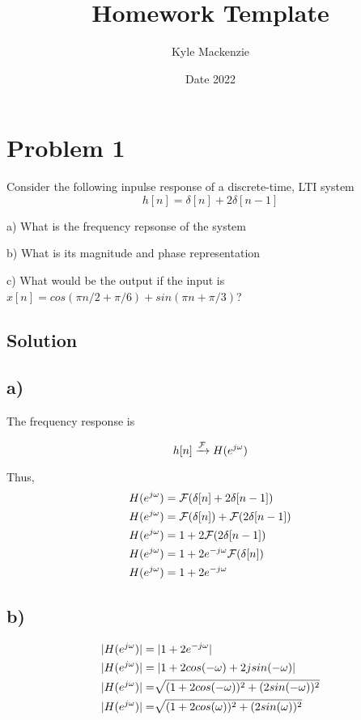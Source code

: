 \documentclass[11pt, fleqn]{article}
\title{Homework Template}
\author{Kyle Mackenzie}
\date{Date 2022}
\begin{document}
\allowdisplaybreaks

\maketitle

\pagebreak

\section*{Problem 1}

Consider the following inpulse response of a discrete-time, LTI system
$$
    h[n] = \delta[n] + 2\delta[n-1]
$$

a) What is the frequency repsonse of the system

b) What is its magnitude and phase representation

c) What would be the output if the input is $x[n] = cos(\pi n/2 + \pi/6) + sin(\pi n + \pi / 3)$?

\subsection*{Solution}

\subsection*{a)}

The frequency response is 

$$
    h[n] \xrightarrow{\mathcal{F}} H(e^{j\omega})
$$

Thus, 
\begin{align*}
    &H(e^{j\omega}) = \mathcal{F}(\delta[n] + 2\delta[n-1]) \\ 
    &H(e^{j\omega}) = \mathcal{F}(\delta[n]) + \mathcal{F}(2\delta[n-1]) \\
    &H(e^{j\omega}) = 1 + 2\mathcal{F}(2\delta[n-1]) \\
    &H(e^{j\omega}) = 1 + 2e^{-j\omega}\mathcal{F}(\delta[n]) \\
    &H(e^{j\omega}) = 1 + 2e^{-j\omega} \\
\end{align*}

\subsection*{b)}

\begin{align*}
    &|H(e^{j\omega})| = |1 + 2e^{-j\omega}| \\
    &|H(e^{j\omega})| = |1 + 2cos(-\omega) + 2jsin(-\omega)| \\
    &|H(e^{j\omega})| = \sqrt[]{(1 + 2cos(-\omega))^2 + (2sin(-\omega))^2} \\
    &|H(e^{j\omega})| = \sqrt[]{(1 + 2cos(\omega))^2 + (2sin(\omega))^2} \\
\end{align*}
\end{document}
